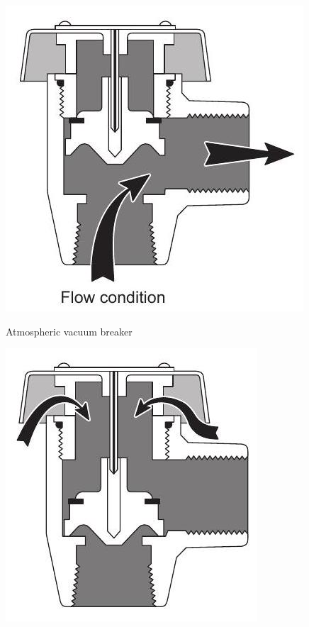 \documentclass[10pt]{article}
\begin{document}
\includegraphics[max width=\textwidth]{AtmosphericVacuumBreaker}

Atmospheric vacuum breaker

\includegraphics[max width=\textwidth]{PressureVacuumBreaker}
\end{document}
